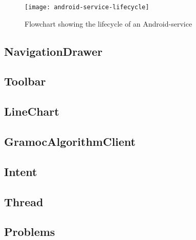 \begin{figure}[H]
	\centering
	\texttt{[image: android-service-lifecycle]}
	\caption{Flowchart showing the lifecycle of an Android-service}
	\label{fig:servicelifecycle}
\end{figure}

\subsection{NavigationDrawer}

\subsection{Toolbar}

\subsection{LineChart}

\subsection{GramocAlgorithmClient}

\subsection{Intent}

\subsection{Thread}

\subsection{Problems}
